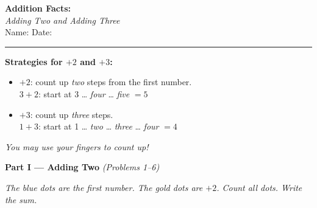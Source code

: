 \documentclass[12pt, letterpaper]{article}
\newcommand{\answerline}{\underline{\hspace{2.5cm}}}
\newcommand{\biganswerline}{\underline{\hspace{4cm}}}
\begin{document}
\begin{center}
  {\LARGE\textbf{\textcolor{scholared}{Addition Facts:}}}\\[4pt]
  {\Large\textcolor{scholagold}{\textit{Adding Two and Adding Three}}}\\[6pt]
  {\small Name: \biganswerline \hspace{1cm} Date: \answerline}
\end{center}

\vspace{4pt}
\noindent\textcolor{scholared}{\rule{\linewidth}{1pt}}
\vspace{4pt}


\begin{lessonbox}
\textbf{Strategies for $+2$ and $+3$:}\\[4pt]
\begin{itemize}[leftmargin=1.5em, itemsep=3pt]
  \item \textbf{$+2$}: count up \emph{two} steps from the first number.\\
        \hspace{1em} $3 + 2$: start at 3 … \textit{four} … \textit{five} \; $= 5$
  \item \textbf{$+3$}: count up \emph{three} steps.\\
        \hspace{1em} $1 + 3$: start at 1 … \textit{two} … \textit{three} … \textit{four} \; $= 4$
\end{itemize}
\medskip
\noindent\textit{You may use your fingers to count up!}
\end{lessonbox}

\bigskip

\noindent\textcolor{scholared}{\large\textbf{Part I — Adding Two}} \hfill \textit{(Problems 1–6)}

\medskip
\noindent\textit{The blue dots are the first number. The gold dots are $+2$. Count all dots. Write the sum.}

\bigskip
\end{document}
